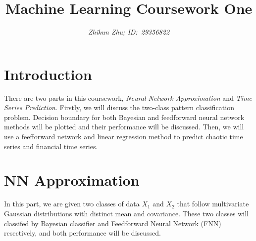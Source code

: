 \documentclass[journal,twocolumn,letterpaper,12pt]{article}
\author{\textsl{Zhikun Zhu; ID:~29356822}}
\title{Machine Learning Coursework One}
\begin{document}
\maketitle
\section{Introduction}
There are two parts in this coursework, \textsl{Neural Network Approximation} and \textsl{Time Series Prediction}. Firstly, we will discuss the two-class pattern classification problem. Decision boundary for both Bayesian and feedforward neural network methods will be plotted and their performance will be discussed. Then, we will use a feefforward network and linear regression method to predict chaotic time series and financial time series.\\

\section{NN Approximation}
In this part, we are given two classes of data $X_1$ and $X_2$ that follow multivariate Gaussian distributions with distinct mean and covariance. These two classes will classifed by Bayesian classifier and Feedforward Neural Network (FNN) resectively, and both performance will be discussed.
\end{document}
